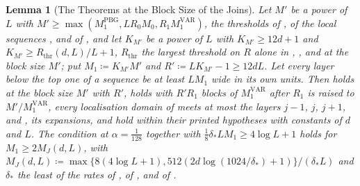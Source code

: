 \documentclass[11pt]{preprint}
\numberwithin{equation}{section}
\newtheorem{lemma}{Lemma}[section]
\theoremstyle{definition}
\theoremstyle{remark}
\theoremstyle{plain}
\begin{document}
\begin{lemma}[The Theorems at the Block Size of the Joins]\label{lem:joins-block-size}
Let $M'$ be a power of $L$ with $M' \geq \max(M_1^{\mathrm{PBG}}, LR_0M_0, R_1M_1^{\mathrm{VAR}})$, the thresholds of \cite[Theorems~3.1--3.3, p.~397]{BalabanPBG}, of the local sequences \cite[p.~408, ll.~26--28]{BalabanPBG}, and of \cite[p.~277, l.~17]{BalabanVAR}, and let $K_{M'}$ be a power of $L$ with $K_{M'} \geq 12d + 1$ and $K_{M'} \geq R_{\mathrm{thr}}(d, L)/L + 1$, $R_{\mathrm{thr}}$ the largest threshold on $R$ alone in \cite{BalabanPRT2}, \cite{BalabanPBG}, and \cite{BalabanVAR} at the block size $M'$; put $M_1 \coloneqq K_{M'}M'$ and $R' \coloneqq LK_{M'} - 1 \geq 12dL$. Let every layer below the top one of a sequence be at least $LM_1$ wide in its own units. Then \cite[(2.2)]{BalabanPRT2} holds at the block size $M'$ with $R'$, \cite[(1)]{BalabanVAR} holds with $R'R_1$ blocks of $M_1^{\mathrm{VAR}}$ after $R_1$ is raised to $M'/M_1^{\mathrm{VAR}}$, every localisation domain of \cite{BalabanPBG} meets at most the layers $j - 1$, $j$, $j + 1$, and \cite[Theorems~3.1--3.3]{BalabanPBG}, its expansions, and \cite[Theorem~1]{BalabanVAR} hold within their printed hypotheses with constants of $d$ and $L$. The condition \cite[(2.59)]{BalabanPRT2} at $\alpha = \frac1{128}$ together with $\frac18\delta_*LM_1 \geq 4\log L + 1$ holds for $M_1 \geq 2M_J(d, L)$, with $M_J(d, L) \coloneqq \max\{8(4\log L + 1), 512(2d\log(1024/\delta_*) + 1)\}/(\delta_*L)$ and $\delta_*$ the least of the rates of \cite[(2.43)]{BalabanPRT2}, of \cite[Theorem~3.1]{BalabanPBG}, and of \cite[p.~423, l.~39]{BalabanPBG}.
\end{lemma}
\end{document}
